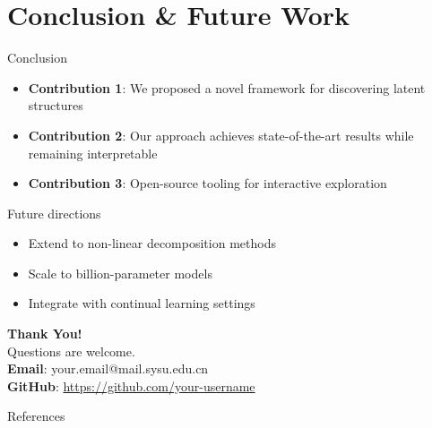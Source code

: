 \documentclass{beamer}
\begin{document}
\section[Conclusion]{Conclusion \& Future Work}

\begin{frame}{Conclusion}
    \begin{itemize}
        \setlength{\itemsep}{0.8em}
        \item \textcolor{AccentBlue}{\textbf{Contribution 1}}: We proposed a novel framework for discovering latent structures
        \item \textcolor{AccentBlue}{\textbf{Contribution 2}}: Our approach achieves state-of-the-art results while remaining interpretable
        \item \textcolor{AccentBlue}{\textbf{Contribution 3}}: Open-source tooling for interactive exploration
    \end{itemize}
    \vspace{0.4cm}
    \begin{block}{Future directions}
        \begin{itemize}
            \item Extend to non-linear decomposition methods
            \item Scale to billion-parameter models
            \item Integrate with continual learning settings
        \end{itemize}
    \end{block}
\end{frame}

\begin{frame}{}
    \vspace{1.5cm}
    \begin{center}
        {\Huge\bfseries Thank You!}\\[0.8cm]
        {\Large Questions are welcome.}\\[1cm]
        {\normalsize
            \textcolor{AccentBlue}{\textbf{Email}}: your.email@mail.sysu.edu.cn\\[0.3cm]
            \textcolor{AccentBlue}{\textbf{GitHub}}: \url{https://github.com/your-username}
        }
    \end{center}
\end{frame}

\begin{frame}[allowframebreaks]{References}
    \printbibliography[heading=none]
\end{frame}
\end{document}
